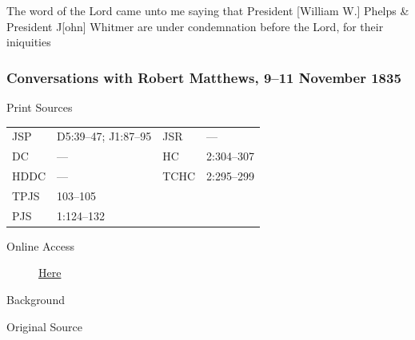 				The word of the Lord came unto me saying that President [William W.] Phelps \& President J[ohn] Whitmer are under condemnation before the Lord, for their iniquities
				
		\subsubsection{Conversations with Robert Matthews, 9--11 November 1835}
			\label{EMS-1835-JS-9-11-NOV-1835}
			
			\begin{description}
				\item[Print Sources]
			\end{description}

				\begin{tabular}{p{0.5in}p{1in}p{0.5in}p{1in}}
				JSP	 	& D5:39--47; J1:87--95		& JSR 		& --- \\
				DC	 	& --- 			& HC 		& 2:304--307 \\
				HDDC 	& ---			& TCHC 		& 2:295--299 \\
				TPJS 	& 103--105		& 	 		&  \\
				PJS 	& 1:124--132			& 	 		&  \\
				\end{tabular}
			
			\begin{description}
				\item[Online Access] \href{https://www.josephsmithpapers.org/paper-summary/conversations-with-robert-matthews-9-11-november-1835/1}{Here}
			\end{description}
			
			\begin{description}
				\item[Background]
			\end{description}
			
			
			\begin{description}
				\item[Original Source]
			\end{description}
			
